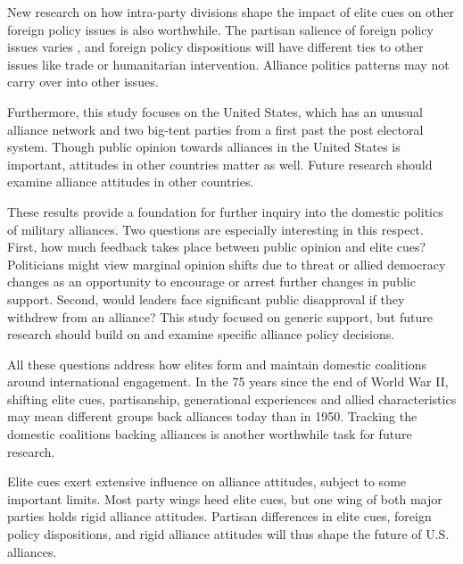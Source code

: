 \documentclass[12pt]{article}
\begin{document}
New research on how intra-party divisions shape the impact of elite cues on other foreign policy issues is also worthwhile. 
The partisan salience of foreign policy issues varies \citep{GuisingerSaunders2017}, and foreign policy dispositions will have different ties to other issues like trade or humanitarian intervention.
Alliance politics patterns may not carry over into other issues.


Furthermore, this study focuses on the United States, which has an unusual alliance network and two big-tent parties from a first past the post electoral system. 
Though public opinion towards alliances in the United States is important, attitudes in other countries matter as well. 
Future research should examine alliance attitudes in other countries. 


These results provide a foundation for further inquiry into the domestic politics of military alliances. 
Two questions are especially interesting in this respect.
First, how much feedback takes place between public opinion and elite cues? 
Politicians might view marginal opinion shifts due to threat or allied democracy changes as an opportunity to encourage or arrest further changes in public support.
Second, would leaders face significant public disapproval if they withdrew from an alliance? 
This study focused on generic support, but future research should build on \citet{TomzWeeks2021} and examine specific alliance policy decisions. 


All these questions address how elites form and maintain domestic coalitions around international engagement. 
In the 75 years since the end of World War II, shifting elite cues, partisanship, generational experiences and allied characteristics may mean different groups back alliances today than in 1950. 
Tracking the domestic coalitions backing alliances is another worthwhile task for future research.


Elite cues exert extensive influence on alliance attitudes, subject to some important limits.
Most party wings heed elite cues, but one wing of both major parties holds rigid alliance attitudes. 
Partisan differences in elite cues, foreign policy dispositions, and rigid alliance attitudes will thus shape the future of U.S. alliances.



\newpage

 
 
\end{document}
